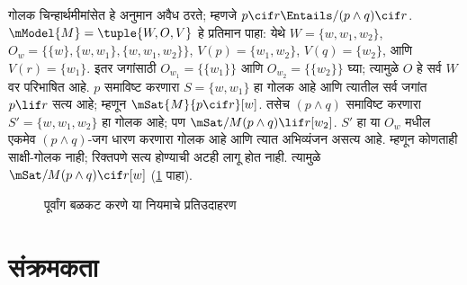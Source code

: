 \begin{ex}
  गोलक चिन्हार्थमीमांसेत हे अनुमान
  अवैध ठरते; म्हणजे
  $p \cif r \Entails/
  (p \land q) \cif r$.
  $\mModel{M} = \tuple{W, O, V}$
  हे प्रतिमान पाहा: येथे
  $W = \{w, w_1, w_2\}$,
  $O_w = \{\{w\}, \{w,
  w_1\}, \{w, w_1, w_2\}\}$,
  $V(p) = \{w_1, w_2\}$,
  $V(q) = \{w_2\}$, आणि
  $V(r) = \{w_1\}$.
  इतर जगांसाठी $O_{w_1}=\{\{w_1\}\}$ आणि
  $O_{w_2}=\{\{w_2\}\}$ घ्या; त्यामुळे $O$ हे
  सर्व $W$ वर परिभाषित आहे.
  $p$ समाविष्ट करणारा
  $S = \{w, w_1\}$
  हा गोलक आहे आणि
  त्यातील सर्व जगांत
  $p \lif r$ सत्य आहे;
  म्हणून
  $\mSat{M}{p \cif r}[w]$.
  तसेच $(p \land q)$
  समाविष्ट करणारा
  $S' = \{w, w_1, w_2\}$
  हा गोलक आहे; पण
  $\mSat/{M}{(p \land q) \lif r}[w_2]$.
  $S'$ हा या $O_w$ मधील एकमेव $(p\land q)$-जग
  धारण करणारा गोलक आहे आणि त्यात अभिव्यंजन असत्य आहे.
  म्हणून कोणताही साक्षी-गोलक नाही; रिक्तपणे सत्य होण्याची
  अटही लागू होत नाही. त्यामुळे
  $\mSat/{M}{(p \land q) \cif r}[w]$
  (\ref{cnt:min:agg:fig:antecedent-strengthening} पाहा).

\begin{figure}
\begin{center}
\caption{पूर्वांग बळकट करणे या नियमाचे प्रतिउदाहरण}
\label{cnt:min:agg:fig:antecedent-strengthening}
\end{center}
\end{figure}
\end{ex}












\section{संक्रमकता}\label{cnt:min:tra:sec}

